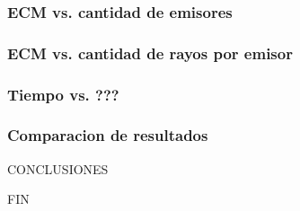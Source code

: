 \documentclass[11pt]{beamer}
\begin{document}
\begin{frame}
\frametitle{ECM vs. cantidad de emisores}
\end{frame}

\begin{frame}
\frametitle{ECM vs. cantidad de rayos por emisor}
\end{frame}


\begin{frame}
\frametitle{Tiempo vs. ???}
\end{frame}


\begin{frame}
\frametitle{Comparacion de resultados}
\end{frame}

\begin{frame}{CONCLUSIONES}
\end{frame}

\begin{frame}{FIN}
\end{frame}



\end{document}
